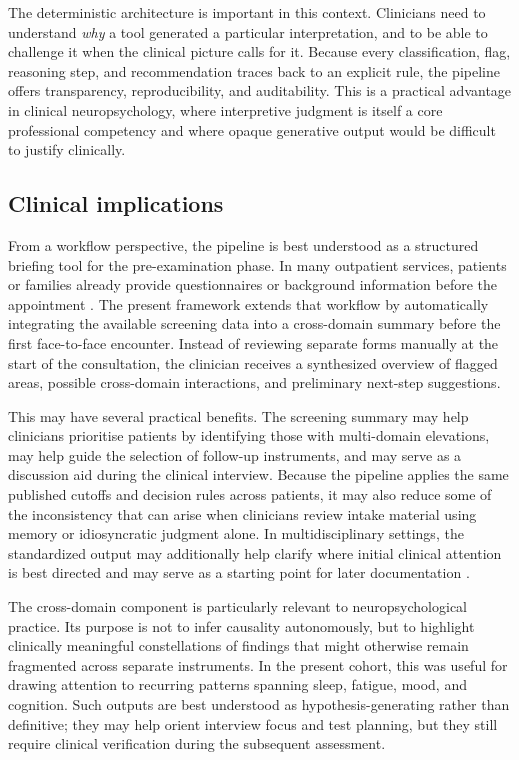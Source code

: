 \documentclass[11pt,a4paper]{article}
\begin{document}
The deterministic architecture is important in this context. Clinicians need to understand \textit{why} a tool generated a particular interpretation, and to be able to challenge it when the clinical picture calls for it. Because every classification, flag, reasoning step, and recommendation traces back to an explicit rule, the pipeline offers transparency, reproducibility, and auditability. 
This is a practical advantage in clinical neuropsychology, where interpretive judgment is itself a core professional competency and where opaque generative output would be difficult to justify clinically. %

\subsection{Clinical implications}

From a workflow perspective, the pipeline is best understood as a structured briefing tool for the pre-examination phase. In many outpatient services, patients or families already provide questionnaires or background information before the appointment \citep[e.g.,][]{KingsCollegeNeuropsychology2026, StanfordNeuropsychologyForms2026}. The present framework extends that workflow by automatically integrating the available screening data into a cross-domain summary before the first face-to-face encounter. Instead of reviewing separate forms manually at the start of the consultation, the clinician receives a synthesized overview of flagged areas, possible cross-domain interactions, and preliminary next-step suggestions.

This may have several practical benefits. The screening summary may help clinicians prioritise patients by identifying those with multi-domain elevations, may help guide the selection of follow-up instruments, and may serve as a discussion aid during the clinical interview. Because the pipeline applies the same published cutoffs and decision rules across patients, it may also reduce some of the inconsistency that can arise when clinicians review intake material using memory or idiosyncratic judgment alone. In multidisciplinary settings, the standardized output may additionally help clarify where initial clinical attention is best directed and may serve as a starting point for later documentation \citep{Postal2018ReportWriting}.

The cross-domain component is particularly relevant to neuropsychological practice. Its purpose is not to infer causality autonomously, but to highlight clinically meaningful constellations of findings that might otherwise remain fragmented across separate instruments. In the present cohort, this was useful for drawing attention to recurring patterns spanning sleep, fatigue, mood, and cognition. Such outputs are best understood as hypothesis-generating rather than definitive; they may help orient interview focus and test planning, but they still require clinical verification during the subsequent assessment.
\end{document}
